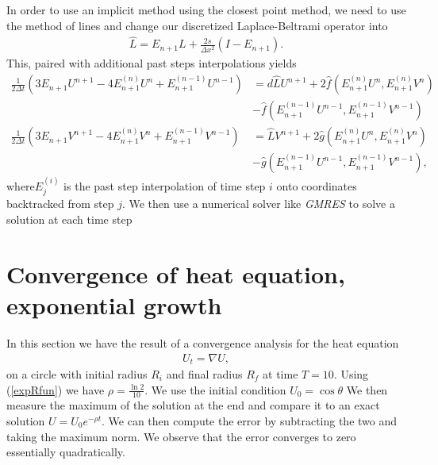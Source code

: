 \documentclass[fleqn,12pt]{siamart1116}
\begin{document}
In order to use an implicit method using the closest point method, we need to use the method of lines and change our discretized Laplace-Beltrami operator into
\begin{align}
\hat{L} = E_{n+1} L + \frac{2s}{\Delta x^2}(I - E_{n+1}).
\end{align}
This, paired with additional past steps interpolations yields
\begin{align}
\frac{1}{2\Delta t}(3E_{n+1}U^{n + 1} - 4E^{(n)}_{n+1}U^n + E^{(n-1)}_{n+1}U^{n-1}) &= d\hat{L}U^{n+1} + 2\hat{f}(E^{(n)}_{n+1}U^n, E^{(n)}_{n+1}V^n)\\
& - \hat{f}(E^{(n-1)}_{n+1}U^{n-1}, E^{(n-1)}_{n+1}V^{n-1})\\
\frac{1}{2\Delta t}(3E_{n+1}V^{n + 1} - 4E^{(n)}_{n+1}V^n + E^{(n-1)}_{n+1}V^{n-1}) &= \hat{L}V^{n+1} + 2\hat{g}(E^{(n)}_{n+1}U^n, E^{(n)}_{n+1}V^n)\\
& - \hat{g}(E^{(n-1)}_{n+1}U^{n-1}, E^{(n-1)}_{n+1}V^{n-1}),
\end{align}
where$E^{(i)}_j$ is the past step interpolation of time step $i$ onto coordinates backtracked from step $j$. We then use a numerical solver like \emph{GMRES} to solve a solution at each time step

\section{Convergence of heat equation, exponential growth}

In this section we have the result of a convergence analysis for the heat equation
\begin{align}
U_t = \nabla U,
\end{align}
on a circle with initial radius $R_i$ and final radius $R_f$ at time $T = 10$. Using (\ref{expRfun}) we have $\rho = \frac{\ln 2}{10}$. We use the initial condition $U_0 = \cos \theta$ We then measure the maximum of the solution at the end and compare it to an exact solution $U = U_0 e^{-\rho t}$. We can then compute the error by subtracting the two and taking the maximum norm. We observe that the error converges to zero essentially quadratically.


\end{document}
